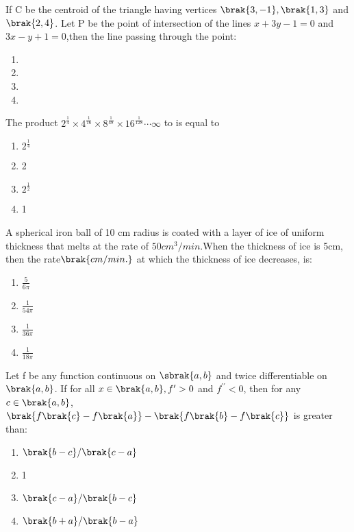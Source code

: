 \iffalse
\title{2020}   
\author{AI24Btech11024}
\section{mcq-single}
\fi
\item If C be the centroid of the triangle having vertices $\brak{3,-1},\brak{1,3}$ and $\brak{2,4}$. Let P be the point of intersection of the lines $x+3y-1=0$ and $3x-y+1=0$,then the line passing through the point$\colon$ \hfill{}
    \begin{enumerate}
        \item {}
        \item {}
        \item {}
        \item {}
    \end{enumerate}
\item The product $2^{\frac{1}{4}}\times4^{\frac{1}{16}}\times8^{\frac{1}{48}}\times16^{\frac{1}{128}}\cdots\infty$ to is equal to \hfill{}
    \begin{enumerate}
        \item $2^{\frac{1}{4}}$
        \item 2
        \item $2^{\frac{1}{2}}$
        \item 1
    \end{enumerate}
\item A spherical iron ball of 10 cm radius is coated with a layer of ice of uniform thickness that melts at the rate of $50 cm^{3}/min$.When the thickness of ice is 5cm, then the rate$\brak{cm/min.}$ at which the thickness of ice decreases, is$\colon$ \hfill{}
    \begin{enumerate}
        \item $\frac{5}{6\pi}$
        \item $\frac{1}{54\pi}$
        \item $\frac{1}{36\pi}$
        \item $\frac{1}{18\pi}$
    \end{enumerate}
\item Let f be any function continuous on $\sbrak{a,b}$ and twice differentiable on $\brak{a,b}$. If for all $x\in\brak{a,b},f^{\prime}>0$ and $f^{\prime\prime}<0$, then for any $c\in\brak{a,b}$, $\brak{f\brak{c}-f\brak{a}}-\brak{f\brak{b}-f\brak{c}}$ is greater than$\colon$ \hfill{}
    \begin{enumerate}
        \item $\brak{b-c}\slash\brak{c-a}$
        \item 1
        \item $\brak{c-a}\slash\brak{b-c}$
        \item $\brak{b+a}\slash\brak{b-a}$
    \end{enumerate} 
